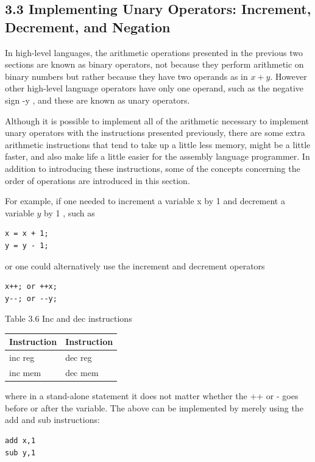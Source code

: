 \documentclass[10pt]{article}
\begin{document}
\subsection*{3.3 Implementing Unary Operators: Increment, Decrement, and Negation}
In high-level languages, the arithmetic operations presented in the previous two sections are known as binary operators, not because they perform arithmetic on binary numbers but rather because they have two operands as in $x+y$. However other high-level language operators have only one operand, such as the negative sign -y , and these are known as unary operators.

Although it is possible to implement all of the arithmetic necessary to implement unary operators with the instructions presented previously, there are some extra arithmetic instructions that tend to take up a little less memory, might be a little faster, and also make life a little easier for the assembly language programmer. In addition to introducing these instructions, some of the concepts concerning the order of operations are introduced in this section.

For example, if one needed to increment a variable x by 1 and decrement a variable $y$ by 1 , such as

\begin{verbatim}
x = x + 1;
y = y - 1;
\end{verbatim}

or one could alternatively use the increment and decrement operators

\begin{verbatim}
x++; or ++x;
y--; or --y;
\end{verbatim}

Table 3.6 Inc and dec instructions

\begin{center}
\begin{tabular}{|l|l|}
\hline
Instruction & Instruction \\
\hline
inc reg & dec reg \\
\hline
inc mem & dec mem \\
\hline
\end{tabular}
\end{center}

where in a stand-alone statement it does not matter whether the ++ or - goes before or after the variable. The above can be implemented by merely using the add and sub instructions:

\begin{verbatim}
add x,1
sub y,1
\end{verbatim}
\end{document}
